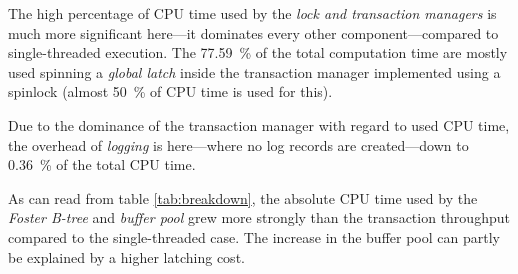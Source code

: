     The high percentage of CPU time used by the \emph{lock and transaction managers} is much more significant here---it dominates every other component---compared to single-threaded execution. The \SI{77.59}{\percent} of the total computation time are mostly used spinning a \emph{global latch} inside the transaction manager implemented using a spinlock (almost \SI{50}{\percent} of CPU time is used for this).

    Due to the dominance of the transaction manager with regard to used CPU time, the overhead of \emph{logging} is here---where no log records are created---down to \SI{0.36}{\percent} of the total CPU time.

    As can read from table \ref{tab:breakdown}, the absolute CPU time used by the \emph{Foster B-tree} and \emph{buffer pool} grew more strongly than the transaction throughput compared to the single-threaded case. The increase in the buffer pool can partly be explained by a higher latching cost.

